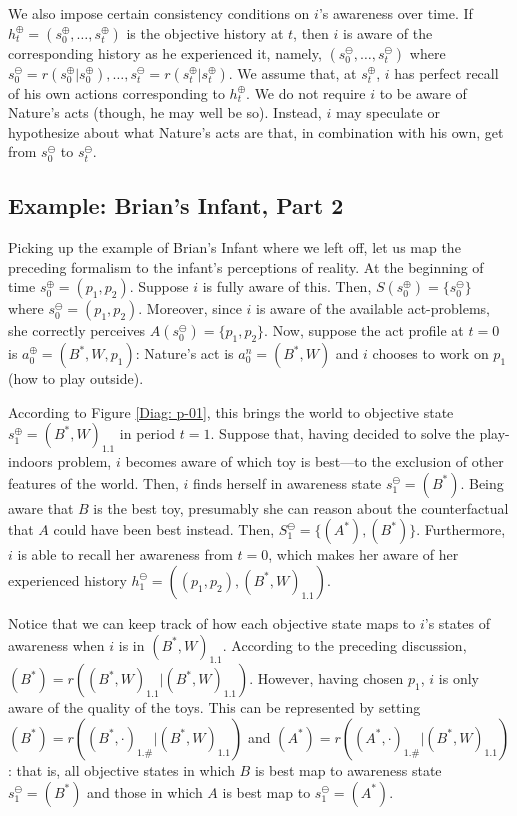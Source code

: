 \documentclass[
11pt,
titlepage,
reqno,
]{article}%
\theoremstyle{definition}
\begin{document}
	We also impose certain consistency conditions on $i$'s awareness over time.
	If $h^\oplus_t=(s^\oplus_0,\ldots,s^\oplus_t)$ is the objective history at $t$, then $i$ is aware of the corresponding history as he experienced it, namely, $(s^\ominus_0,\ldots,s^\ominus_t)$ where $s^\ominus_0=r(s^\oplus_0|s^\oplus_0),\ldots, s^\ominus_t=r(s^\oplus_t|s^\oplus_t)$.
	We assume that, at $s^\oplus_t$, $i$ has perfect recall of his own actions corresponding to  $h^\oplus_t$.
	We do not require $i$ to be aware of Nature's acts (though, he may well be so).
	Instead, $i$ may speculate or hypothesize about what Nature's acts are that, in combination with his own, get from $s^\ominus_0$ to $s^\ominus_t$.
	
	\subsection{Example: Brian's Infant, Part 2}	
	Picking up the example of Brian's Infant where we left off, let us map the preceding formalism to the infant's perceptions of reality.
	At the beginning of time $s^\oplus_0=(p_1,p_2)$.
	Suppose $i$ is fully aware of this.
	Then, $S(s^\oplus_0)=\{s^\ominus_0\}$ where $s^\ominus_0=(p_1,p_2)$.
	Moreover, since $i$ is aware of the available act-problems, she correctly perceives $A(s^\ominus_0)=\{p_1,p_2\}$.
	Now, suppose the act profile at $t=0$ is $a^\oplus_0=(B^\ast,W,p_1)$: Nature's act is $a^n_0=(B^\ast,W)$ and $i$ chooses to work on $p_1$ (how to play outside).
	
	According to Figure \ref{Diag: p-01}, this brings the world to objective state $s^\oplus_1=(B^\ast,W)_{1.1}$ in period $t=1$.
	Suppose that, having decided to solve the play-indoors problem, $i$ becomes aware of which toy is best---to the exclusion of other features of the world.
	Then, $i$ finds herself in awareness state $s^\ominus_1=(B^\ast)$.
	Being aware that $B$ is the best toy, presumably she can reason about the counterfactual that $A$ could have been best instead.
	Then, $S^\ominus_1=\{(A^\ast),(B^\ast)\}$.
	Furthermore, $i$ is able to recall her awareness from $t=0$, which makes her aware of her experienced history $h_1^\ominus=\left((p_1,p_2),(B^\ast,W)_{1.1}\right)$.
	
	Notice that we can keep track of how each objective state maps to $i$'s states of awareness when $i$ is in $(B^\ast,W)_{1.1}$. 
	According to the preceding discussion, $(B^\ast)=r((B^\ast,W)_{1.1}|(B^\ast,W)_{1.1})$.
	However, having chosen $p_1$, $i$ is only aware of the quality of the toys.
	This can be represented by setting $(B^\ast)=r((B^\ast,\cdot)_{1.\#}|(B^\ast,W)_{1.1})$ and $(A^\ast)=r((A^\ast,\cdot)_{1.\#}|(B^\ast,W)_{1.1})$: that is, all objective states in which $B$ is best map to awareness state $s^\ominus_1=(B^\ast)$ and those in which $A$ is best map to $s^\ominus_1=(A^\ast)$.
	
\end{document}
